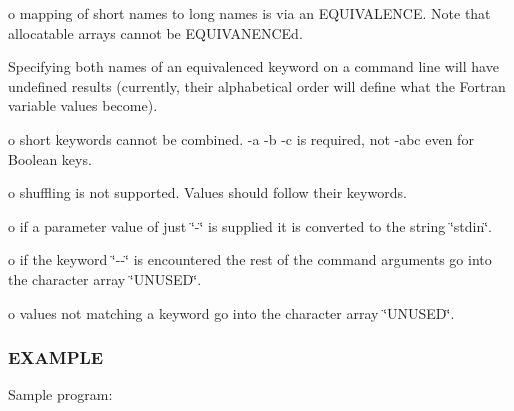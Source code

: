 o mapping of short names to long names is via an E\+Q\+U\+I\+V\+A\+L\+E\+N\+CE. Note that allocatable arrays cannot be E\+Q\+U\+I\+V\+A\+N\+E\+N\+C\+Ed.

Specifying both names of an equivalenced keyword on a command line will have undefined results (currently, their alphabetical order will define what the Fortran variable values become).

o short keywords cannot be combined. -\/a -\/b -\/c is required, not -\/abc even for Boolean keys.

o shuffling is not supported. Values should follow their keywords.

o if a parameter value of just \char`\"{}-\/\char`\"{} is supplied it is converted to the string \char`\"{}stdin\char`\"{}.

o if the keyword \char`\"{}-\/-\/\char`\"{} is encountered the rest of the command arguments go into the character array \char`\"{}\+U\+N\+U\+S\+E\+D\char`\"{}.

o values not matching a keyword go into the character array \char`\"{}\+U\+N\+U\+S\+E\+D\char`\"{}.

\subsubsection*{E\+X\+A\+M\+P\+LE}

Sample program\+:


